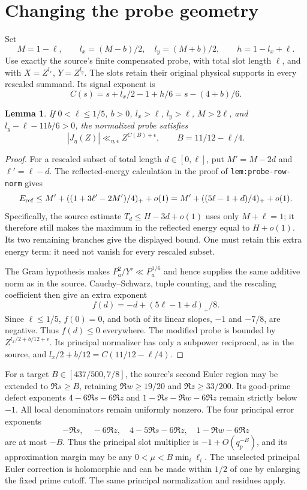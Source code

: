 \documentclass[11pt]{article}
\newtheorem{lemma}{Lemma}
\newcommand{\pos}[1]{(#1)_+}
\begin{document}
\section{Changing the probe geometry}

Set
\begin{equation}\label{eq:geometry}
 M=1-\ell,\qquad l_x=(M-b)/2,\quad l_y=(M+b)/2,
 \qquad h=1-l_x+\ell.
\end{equation}
Use exactly the source's finite compensated probe, with total slot length
$\ell$, and with $X=Z^{l_x}$, $Y=Z^{l_y}$. The slots retain their
original physical supports in every rescaled summand. Its signal exponent
is
\[
 C(s)=s+l_x/2-1+h/6=s-(4+b)/6.
\]

\begin{lemma}\label{lem:low}
If $0<\ell\le1/5$, $b>0$, $l_x>\ell$, $l_y>\ell$,
$M>2\ell$, and $l_y-\ell-11b/6>0$, the normalized probe satisfies
\[
 |J_\eta(Z)|\ll_{\eta,\epsilon}Z^{C(B)+\epsilon},
 \qquad B=11/12-\ell/4.
\]
\end{lemma}
\begin{proof}
For a rescaled subset of total length $d\in[0,\ell]$, put
$M'=M-2d$ and $\ell'=\ell-d$. The reflected-energy calculation in the
proof of \texttt{lem:probe-row-norm} gives
\[
 E_{\rm ref}\le M'+\pos{(1+3\ell'-2M')/4}+o(1)
 =M'+\pos{(5\ell-1+d)/4}+o(1).
\]
Specifically, the source estimate $T_d\le H-3d+o(1)$ uses only
$M+\ell=1$; it therefore still makes the maximum in the reflected
energy equal to $H+o(1)$. Its two remaining branches give the displayed
bound. One must retain this extra energy term: it need not vanish for
every rescaled subset.

The Gram hypothesis makes $P_a^2/Y'\ll P_a^{1/6}$ and hence supplies
the same additive norm as in the source. Cauchy--Schwarz, tuple counting,
and the rescaling coefficient then give an extra exponent
\[
 f(d)=-d+\pos{5\ell-1+d}/8.
\]
Since $\ell\le1/5$, $f(0)=0$, and both of its linear slopes,
$-1$ and $-7/8$, are negative. Thus $f(d)\le0$ everywhere.
The modified probe is bounded by $Z^{l_x/2+b/12+\epsilon}$.
Its principal normalizer has only a subpower reciprocal, as in the source,
and $l_x/2+b/12=C(11/12-\ell/4)$.
\end{proof}

For a target $B\in[437/500,7/8]$, the source's second Euler region may
be extended to $\Re s\ge B$, retaining $\Re w\ge19/20$ and
$\Re z\ge33/200$. Its good-prime defect exponents
$4-6\Re s-6\Re z$ and $1-\Re s-\Re w-6\Re z$ remain strictly
below $-1$. All local denominators remain uniformly nonzero.
The four principal error exponents
\[
 -\Re s,\quad-6\Re z,\quad4-5\Re s-6\Re z,
 \quad1-\Re w-6\Re z
\]
are at most $-B$. Thus the principal slot multiplier is
$-1+O(q_p^{-B})$, and its approximation margin may be any
$0<\mu<B\min_i\ell_i$. The unselected principal Euler correction
is holomorphic and can be made within $1/2$ of one by enlarging the
fixed prime cutoff. The same principal normalization and residues apply.
\end{document}
